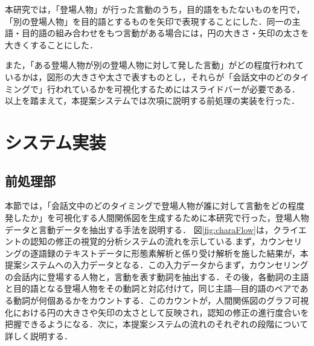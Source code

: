 \documentclass[shuuron]{kuee}
\begin{document}
本研究では，「登場人物」が行った言動のうち，目的語をもたないものを円で，「別の登場人物」を目的語とするものを矢印で表現することにした．同一の主語・目的語の組み合わせをもつ言動がある場合には，円の大きさ・矢印の太さを大きくすることにした．

また，「ある登場人物が別の登場人物に対して発した言動」がどの程度行われているかは，図形の大きさや太さで表すものとし，それらが「会話文中のどのタイミングで」行われているかを可視化するためにはスライドバーが必要である．
以上を踏まえて，本提案システムでは次項に説明する前処理の実装を行った．







\section{システム実装} %

\subsection{前処理部} %


本節では，「会話文中のどのタイミングで登場人物が誰に対して言動をどの程度発したか」を可視化する人間関係図を生成するために本研究で行った，登場人物データと言動データを抽出する手法を説明する．%
図\ref{fig:charaFlow}は，クライエントの認知の修正の視覚的分析システムの流れを示している.まず，カウンセリングの逐語録のテキストデータに形態素解析と係り受け解析を施した結果が，本提案システムへの入力データとなる．この入力データからまず，カウンセリングの会話内に登場する人物と，言動を表す動詞を抽出する．その後，各動詞の主語と目的語となる登場人物をその動詞と対応付けて，同じ主語―目的語のペアである動詞が何個あるかをカウントする．このカウントが，人間関係図のグラフ可視化における円の大きさや矢印の太さとして反映され，認知の修正の進行度合いを把握できるようになる．次に，本提案システムの流れのそれぞれの段階について詳しく説明する．
\end{document}
